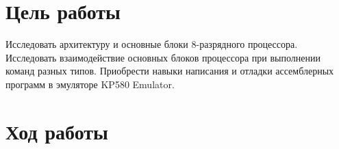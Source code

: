 \documentclass[a4paper,14pt]{extarticle}
\begin{document}

\section{Цель работы}
Исследовать архитектуру и основные блоки 8-разрядного процессора.
Исследовать взаимодействие основных блоков процессора при выполнении команд
разных типов. Приобрести навыки написания и отладки ассемблерных программ в
эмуляторе KP580 Emulator.

\section{Ход работы}
\begin{enumerate}
    
\end{enumerate}
\end{document}
